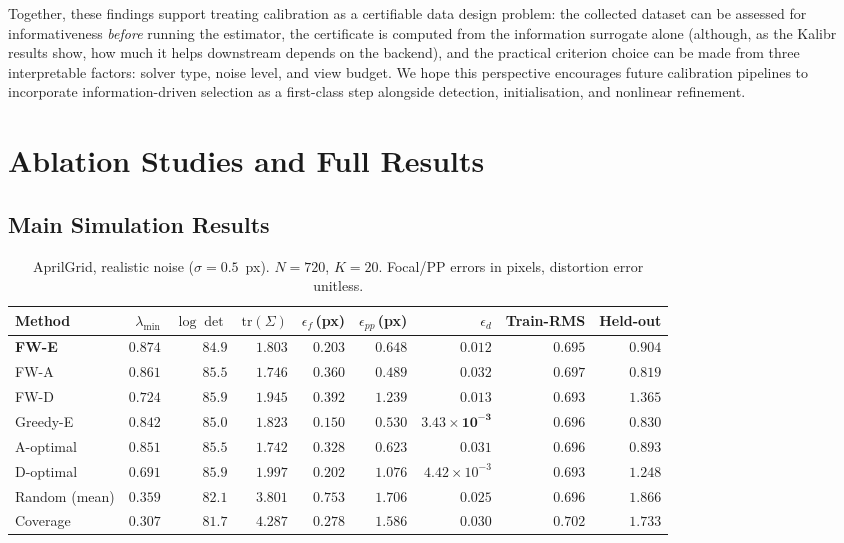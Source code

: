\documentclass[letterpaper, 9
 pt, conference]{ieeeconf}
\begin{document}
Together, these findings support treating calibration as a certifiable data
design problem: the collected dataset can be assessed for informativeness
\emph{before} running the estimator, the certificate is computed from the
information surrogate alone (although, as the Kalibr results show, how much it
helps downstream depends on the backend), and the practical criterion choice can be made from three interpretable factors:
solver type, noise level, and view budget.
We hope this perspective encourages future calibration pipelines to incorporate
information-driven selection as a first-class step alongside detection,
initialisation, and nonlinear refinement.




\clearpage
\appendix
\section{Ablation Studies and Full Results}
\label{sec:appendix}

\subsection{Main Simulation Results}

\begin{table}[t]
\centering
\setlength{\tabcolsep}{4pt}
\caption{AprilGrid, realistic noise ($\sigma{=}0.5$~px). $N{=}720$, $K{=}20$.
Focal/PP errors in pixels, distortion error unitless.}
\label{tab:aprilgrid_sigma05}
\footnotesize
\begin{tabular}{lrrrrrrrr}
\toprule
Method & $\lambda_{\min}$ & $\log\det$ & $\mathrm{tr}(\Sigma)$ & $\epsilon_f$\,(px) & $\epsilon_{pp}$\,(px) & $\epsilon_d$ & Train-RMS & Held-out \\
\midrule
\textbf{FW-E} & $\mathbf{0.874}$ & $84.9$ & $1.803$ & $0.203$ & $0.648$ & $0.012$ & $0.695$ & $0.904$ \\
FW-A & $0.861$ & $85.5$ & $1.746$ & $0.360$ & $\mathbf{0.489}$ & $0.032$ & $0.697$ & $\mathbf{0.819}$ \\
FW-D & $0.724$ & $85.9$ & $1.945$ & $0.392$ & $1.239$ & $0.013$ & $\mathbf{0.693}$ & $1.365$ \\
Greedy-E & $0.842$ & $85.0$ & $1.823$ & $\mathbf{0.150}$ & $0.530$ & $\mathbf{3.43\!\times\!10^{-3}}$ & $0.696$ & $0.830$ \\
A-optimal & $0.851$ & $85.5$ & $\mathbf{1.742}$ & $0.328$ & $0.623$ & $0.031$ & $0.696$ & $0.893$ \\
D-optimal & $0.691$ & $\mathbf{85.9}$ & $1.997$ & $0.202$ & $1.076$ & $4.42\!\times\!10^{-3}$ & $0.693$ & $1.248$ \\
Random (mean) & $0.359$ & $82.1$ & $3.801$ & $0.753$ & $1.706$ & $0.025$ & $0.696$ & $1.866$ \\
Coverage & $0.307$ & $81.7$ & $4.287$ & $0.278$ & $1.586$ & $0.030$ & $0.702$ & $1.733$ \\
\bottomrule
\end{tabular}
\end{table}
\end{document}
